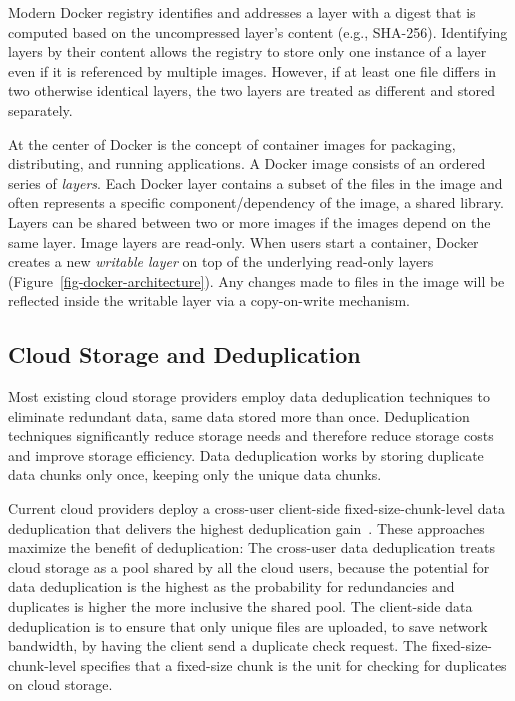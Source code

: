 Modern Docker registry identifies and addresses a layer with a digest that is computed based on the uncompressed layer's content (e.g., SHA-256).
Identifying layers by their content allows the registry to store only one instance of a layer even if it is referenced by multiple images. 
However, if at least one file differs in two otherwise identical layers, the two layers are treated as different and stored separately.

At the center of Docker is the concept of container images for packaging, distributing, and running applications.
A Docker image consists of an ordered series of \emph{layers}.
Each Docker layer contains a subset of the files in the image and often represents a specific component/dependency of the image, \eg a shared library.
Layers can be shared between two or more images if the images depend on the same layer.
Image layers are read-only.
When users start a container, Docker creates a new \emph{writable layer} on top of the underlying read-only layers (Figure~\ref{fig-docker-architecture}).
Any changes made to files in the image will be reflected inside the writable layer via a copy-on-write mechanism.


\subsection{Cloud Storage and Deduplication}
 
Most existing cloud storage providers employ data deduplication techniques to eliminate redundant data, same data stored more than once. 
Deduplication techniques significantly reduce storage needs and therefore reduce storage costs and improve storage efficiency. 
Data deduplication works by storing duplicate data chunks only once, keeping only the unique data chunks. 

Current cloud providers deploy a cross-user client-side fixed-size-chunk-level data deduplication that delivers the highest deduplication gain~\cite{pooranian2018rare}. 
These approaches maximize the benefit of deduplication: 
The cross-user data deduplication treats cloud storage as a pool shared by all the cloud users, because the potential for 
data deduplication is the highest as the probability for redundancies and duplicates is higher the more inclusive the shared pool. 
The client-side data deduplication is to ensure that only unique files are uploaded, to save network bandwidth, by having the client send a duplicate check request. 
The fixed-size-chunk-level specifies that a fixed-size chunk is the unit for checking for duplicates on cloud storage.

